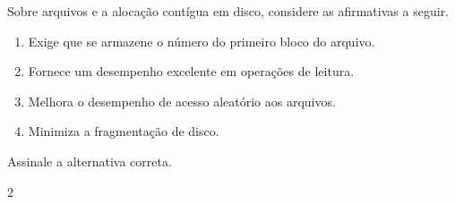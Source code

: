 %
%
{
\def\AMCbeginQuestion#1#2{\par\noindent{\bf (POSCOMP 2013 - Questão 22)}}
\begin{question}{} Sobre arquivos e a alocação contígua em disco, considere as afirmativas a seguir.

\begin{enumerate}[label=\Roman*.]
\item Exige que se armazene o número do primeiro bloco do arquivo.
\item Fornece um desempenho excelente em operações de leitura.
\item Melhora o desempenho de acesso aleatório aos arquivos.
\item Minimiza a fragmentação de disco.
\end{enumerate}

Assinale a alternativa correta.
\begin{multicols}{2}\columnseprule=0.1pt
\begin{choices}
\end{choices}
\end{multicols}
\end{question}
}